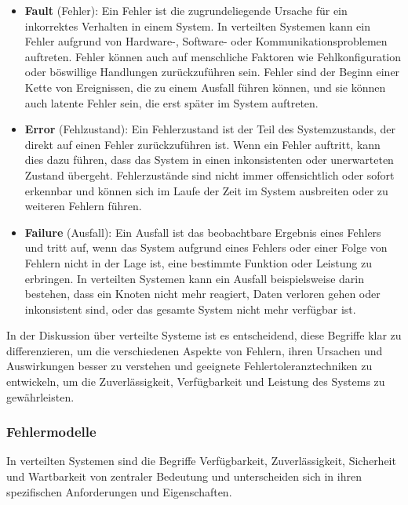 \begin{itemize}
\item \textbf{Fault} (Fehler): Ein Fehler ist die zugrundeliegende Ursache für ein inkorrektes Verhalten in einem System. In verteilten Systemen kann ein Fehler aufgrund von Hardware-, Software- oder Kommunikationsproblemen auftreten. Fehler können auch auf menschliche Faktoren wie Fehlkonfiguration oder böswillige Handlungen zurückzuführen sein. Fehler sind der Beginn einer Kette von Ereignissen, die zu einem Ausfall führen können, und sie können auch latente Fehler sein, die erst später im System auftreten.
\item \textbf{Error} (Fehlzustand): Ein Fehlerzustand ist der Teil des Systemzustands, der direkt auf einen Fehler zurückzuführen ist. Wenn ein Fehler auftritt, kann dies dazu führen, dass das System in einen inkonsistenten oder unerwarteten Zustand übergeht. Fehlerzustände sind nicht immer offensichtlich oder sofort erkennbar und können sich im Laufe der Zeit im System ausbreiten oder zu weiteren Fehlern führen.
\item \textbf{Failure} (Ausfall): Ein Ausfall ist das beobachtbare Ergebnis eines Fehlers und tritt auf, wenn das System aufgrund eines Fehlers oder einer Folge von Fehlern nicht in der Lage ist, eine bestimmte Funktion oder Leistung zu erbringen. In verteilten Systemen kann ein Ausfall beispielsweise darin bestehen, dass ein Knoten nicht mehr reagiert, Daten verloren gehen oder inkonsistent sind, oder das gesamte System nicht mehr verfügbar ist.
\end{itemize}
In der Diskussion über verteilte Systeme ist es entscheidend, diese Begriffe klar zu differenzieren, um die verschiedenen Aspekte von Fehlern, ihren Ursachen und Auswirkungen besser zu verstehen und geeignete Fehlertoleranztechniken zu entwickeln, um die Zuverlässigkeit, Verfügbarkeit und Leistung des Systems zu gewährleisten.


\subsubsection{Fehlermodelle}

In verteilten Systemen sind die Begriffe Verfügbarkeit, Zuverlässigkeit, Sicherheit und Wartbarkeit von zentraler Bedeutung und unterscheiden sich in ihren spezifischen Anforderungen und Eigenschaften.

